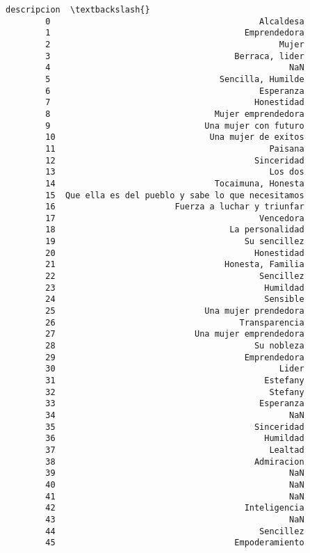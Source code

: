 \documentclass[11pt]{article}
\begin{document}
\begin{Verbatim}[commandchars=\\\{\}]
                                                 descripcion  \textbackslash{}
        0                                          Alcaldesa   
        1                                       Emprendedora   
        2                                              Mujer   
        3                                     Berraca, lider   
        4                                                NaN   
        5                                  Sencilla, Humilde   
        6                                          Esperanza   
        7                                         Honestidad   
        8                                 Mujer emprendedora   
        9                               Una mujer con futuro   
        10                               Una mujer de exitos   
        11                                           Paisana   
        12                                        Sinceridad   
        13                                           Los dos   
        14                                Tocaimuna, Honesta   
        15  Que ella es del pueblo y sabe lo que necesitamos   
        16                        Fuerza a luchar y triunfar   
        17                                         Vencedora   
        18                                   La personalidad   
        19                                      Su sencillez   
        20                                        Honestidad   
        21                                  Honesta, Familia   
        22                                         Sencillez   
        23                                          Humildad   
        24                                          Sensible   
        25                              Una mujer prendedora   
        26                                     Transparencia   
        27                            Una mujer emprendedora   
        28                                        Su nobleza   
        29                                      Emprendedora   
        30                                             Lider   
        31                                          Estefany   
        32                                           Stefany   
        33                                         Esperanza   
        34                                               NaN   
        35                                        Sinceridad   
        36                                          Humildad   
        37                                           Lealtad   
        38                                        Admiracion   
        39                                               NaN   
        40                                               NaN   
        41                                               NaN   
        42                                      Inteligencia   
        43                                               NaN   
        44                                         Sencillez   
        45                                    Empoderamiento   
        

\end{Verbatim}
\end{document}
